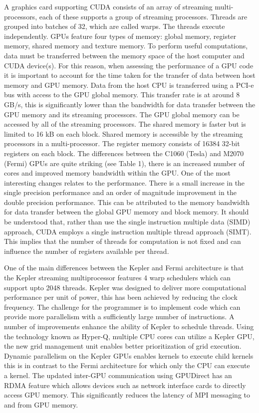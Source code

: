A graphics card supporting CUDA consists of an array of streaming multi-processors, each of these supports a group of streaming processors. Threads are grouped into batches of 32, which are called warps. The threads execute independently. GPUs feature four types of memory: global memory, register memory, shared memory and texture memory. To perform useful computations, data must be transferred between the memory space of the host computer and CUDA device(s). For this reason, when assessing the performance of a GPU code it is important to account for the time taken for the transfer of data between host memory and GPU memory. Data from the host CPU is transferred using a PCI-e bus with access to the GPU global memory. This transfer rate is at around 8 GB/s, this is significantly lower than the bandwidth for data transfer between the GPU memory and its streaming processors. The GPU global memory can be accessed by all of the streaming processors. The shared  memory is faster but is limited to 16 kB on each block. Shared memory is accessible by the streaming processors in a multi-processor. The register memory consists of 16384 32-bit registers on each  block. The differences between the C1060 (Tesla) and  M2070 (Fermi) GPUs are quite striking (see Table 1), there is an increased number of cores and improved memory bandwidth within the GPU. One of the most interesting changes relates to the performance. There is a small increase in the single precision performance and an order of magnitude improvement in the double precision performance. This can be attributed to the memory bandwidth for data transfer between the global GPU memory and block memory. It should be understood that, rather than use the single instruction multiple data (SIMD) approach, CUDA employs a single instruction multiple thread approach (SIMT). This implies that the number of threads for computation is not fixed  and can influence the number of registers available per thread.

One of the main differences between the Kepler and Fermi architecture is that the Kepler streaming multiprocessor features 4 warp schedulers which can support upto 2048 threads.  Kepler was designed to deliver more computational performance per unit of power, this has been achieved by reducing the clock frequency. The challenge for the programmer is to implement code which can provide more parallelism with a sufficiently large number of instructions. A number of improvements enhance the ability of Kepler to schedule threads. Using the technology known as Hyper-Q,  multiple CPU cores can utilize a Kepler GPU, the new grid management unit enables better prioritization of grid execution. Dynamic parallelism on the Kepler GPUs enables kernels to execute child kernels this is in contrast to the Fermi architecture for which only the CPU can execute a kernel. The updated inter-GPU communication using GPUDirect has an RDMA feature which allows devices such as network interface cards to directly access GPU memory. This significantly reduces the latency of MPI messaging to and from GPU memory.

